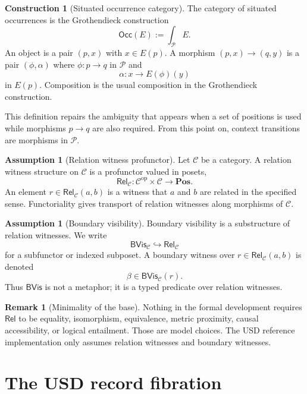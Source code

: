 \documentclass[11pt]{article}
\newcommand{\Occ}{\mathsf{Occ}}
\newcommand{\Rel}{\mathsf{Rel}}
\newcommand{\BVis}{\mathsf{BVis}}
\newcommand{\op}{\mathrm{op}}
\newcommand{\defeq}{\mathrel{:=}}
\newcommand{\Pos}{\mathbf{Pos}}
\theoremstyle{definition}
\newtheorem{construction}[definition]{Construction}
\newtheorem{remark}[definition]{Remark}
\newtheorem{assumption}[definition]{Assumption}
\theoremstyle{plain}
\begin{document}
\begin{construction}[Situated occurrence category]
The category of situated occurrences is the Grothendieck construction
\[
  \Occ(E)\defeq \int_{\mathcal P}E.
\]
An object is a pair $(p,x)$ with $x\in E(p)$.  A morphism
$(p,x)\to(q,y)$ is a pair $(\phi,\alpha)$ where $\phi:p\to q$ in
$\mathcal P$ and
\[
  \alpha:x\to E(\phi)(y)
\]
in $E(p)$.  Composition is the usual composition in the Grothendieck
construction.
\end{construction}

This definition repairs the ambiguity that appears when a set of
positions is used while morphisms $p\to q$ are also required.  From this
point on, context transitions are morphisms in $\mathcal P$.

\begin{assumption}[Relation witness profunctor]
Let $\mathcal C$ be a category.  A relation witness structure on
$\mathcal C$ is a profunctor valued in posets,
\[
  \Rel_{\mathcal C}:\mathcal C^{\op}\times\mathcal C\to \Pos.
\]
An element $r\in \Rel_{\mathcal C}(a,b)$ is a witness that $a$ and $b$
are related in the specified sense.  Functoriality gives transport of
relation witnesses along morphisms of $\mathcal C$.
\end{assumption}

\begin{assumption}[Boundary visibility]
Boundary visibility is a substructure of relation witnesses.  We write
\[
  \BVis_{\mathcal C}\hookrightarrow \Rel_{\mathcal C}
\]
for a subfunctor or indexed subposet.  A boundary witness over
$r\in\Rel_{\mathcal C}(a,b)$ is denoted
\[
  \beta\in \BVis_{\mathcal C}(r).
\]
Thus $\BVis$ is not a metaphor; it is a typed predicate over relation
witnesses.
\end{assumption}

\begin{remark}[Minimality of the base]
Nothing in the formal development requires $\Rel$ to be equality,
isomorphism, equivalence, metric proximity, causal accessibility, or
logical entailment.  Those are model choices.  The USD reference
implementation only assumes relation witnesses and boundary witnesses.
\end{remark}

\section{The USD record fibration}
\end{document}
